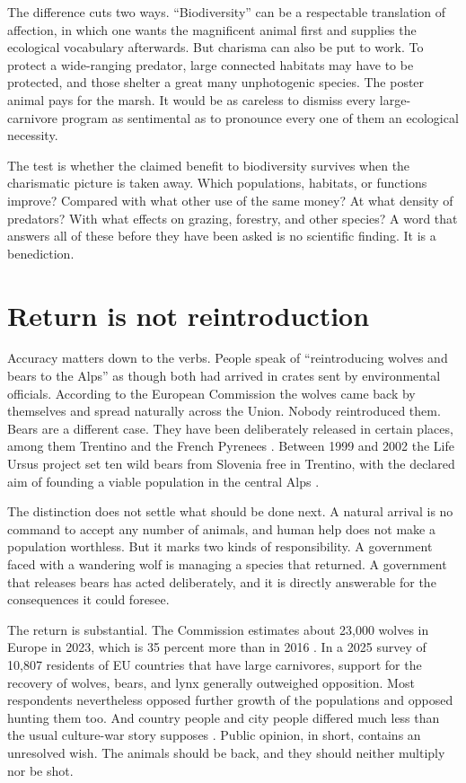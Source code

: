\documentclass[12pt,a4paper]{book}
\begin{document}
The difference cuts two ways. ``Biodiversity'' can be a respectable translation of affection, in which one wants the magnificent animal first and supplies the ecological vocabulary afterwards. But charisma can also be put to work. To protect a wide-ranging predator, large connected habitats may have to be protected, and those shelter a great many unphotogenic species. The poster animal pays for the marsh. It would be as careless to dismiss every large-carnivore program as sentimental as to pronounce every one of them an ecological necessity.

The test is whether the claimed benefit to biodiversity survives when the charismatic picture is taken away. Which populations, habitats, or functions improve? Compared with what other use of the same money? At what density of predators? With what effects on grazing, forestry, and other species? A word that answers all of these before they have been asked is no scientific finding. It is a benediction.

\section{Return is not reintroduction}

Accuracy matters down to the verbs. People speak of ``reintroducing wolves and bears to the Alps'' as though both had arrived in crates sent by environmental officials. According to the European Commission the wolves came back by themselves and spread naturally across the Union. Nobody reintroduced them. Bears are a different case. They have been deliberately released in certain places, among them Trentino and the French Pyrenees \cite{ECLargeCarnivoreFacts2026}. Between 1999 and 2002 the Life Ursus project set ten wild bears from Slovenia free in Trentino, with the declared aim of founding a viable population in the central Alps \cite{TrentinoLifeUrsus}.

The distinction does not settle what should be done next. A natural arrival is no command to accept any number of animals, and human help does not make a population worthless. But it marks two kinds of responsibility. A government faced with a wandering wolf is managing a species that returned. A government that releases bears has acted deliberately, and it is directly answerable for the consequences it could foresee.

The return is substantial. The Commission estimates about 23,000 wolves in Europe in 2023, which is 35 percent more than in 2016 \cite{ECLargeCarnivoreFacts2026}. In a 2025 survey of 10,807 residents of EU countries that have large carnivores, support for the recovery of wolves, bears, and lynx generally outweighed opposition. Most respondents nevertheless opposed further growth of the populations and opposed hunting them too. And country people and city people differed much less than the usual culture-war story supposes \cite{ChapronCarnivoreOpinion2026}. Public opinion, in short, contains an unresolved wish. The animals should be back, and they should neither multiply nor be shot.
\end{document}
